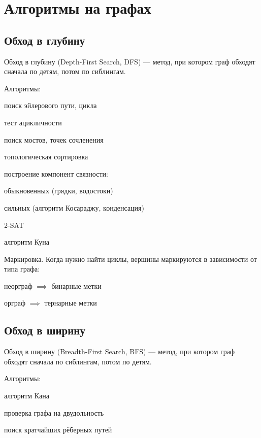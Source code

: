 \section{Алгоритмы на графах}

\subsection{Обход в глубину}

{\bold Обход в глубину} {\ital (Depth-First Search, DFS)} --- метод, при котором граф обходят сначала по детям, потом по сиблингам.

{\bold Алгоритмы:}
\begin{list*}
\item поиск эйлерового пути, цикла
\item тест ацикличности
\item поиск мостов, точек сочленения
\item топологическая сортировка
\item построение компонент связности:
\begin{list*}[2]
\item обыкновенных {\ital\color{desc} (грядки, водостоки)}
\item сильных {\ital\color{desc} (алгоритм Косараджу, конденсация)}
\end{list*}
\item 2-SAT
\item алгоритм Куна
\end{list*}

\begin{theorem}
{\bold Маркировка.} Когда нужно найти {\ital циклы}, вершины маркируются в зависимости от типа графа: 
\begin{list*}
\item неорграф $\implies$ {\ital бинарные} метки
\item орграф $\implies$ {\ital тернарные} метки
\end{list*}
\end{theorem}

\subsection{Обход в ширину}

{\bold Обход в ширину} {\ital (Breadth-First Search, BFS)} --- метод, при котором граф обходят сначала по сиблингам, потом по детям.

{\bold Алгоритмы:}
\begin{list*}
\item алгоритм Кана
\item проверка графа на двудольность
\item поиск кратчайших рёберных путей
\end{list*}

